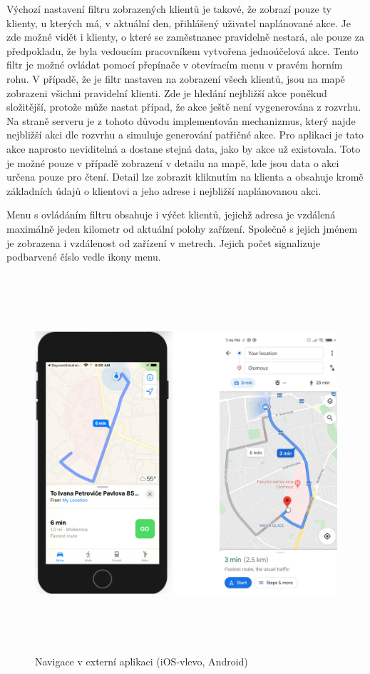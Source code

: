 \documentclass[
  glossaries,
]{kidiplom}
\begin{document}
Výchozí nastavení filtru zobrazených klientů je takové, že zobrazí pouze ty klienty, u kterých má, v aktuální den, přihlášený uživatel naplánované akce. Je zde možné vidět i klienty, o které se zaměstnanec pravidelně nestará, ale pouze za předpokladu, že byla vedoucím pracovníkem vytvořena jednoúčelová akce. Tento filtr je možné ovládat pomocí přepínače v otevíracím menu v pravém horním rohu. V případě, že je filtr nastaven na zobrazení všech klientů, jsou na mapě zobrazeni všichni pravidelní klienti. Zde je hledání nejbližší akce poněkud složitější, protože může nastat případ, že akce ještě není vygenerována z rozvrhu. Na straně serveru je z tohoto důvodu implementován mechanizmus, který najde nejbližší akci dle rozvrhu a simuluje generování patřičné akce. Pro aplikaci je tato akce naprosto neviditelná a dostane stejná data, jako by akce už existovala. Toto je možné pouze v případě zobrazení v detailu na mapě, kde jsou data o akci určena pouze pro čtení. Detail lze zobrazit kliknutím na klienta a obsahuje kromě základních údajů o klientovi a jeho adrese i nejbližší naplánovanou akci. 

Menu s ovládáním filtru obsahuje i výčet klientů, jejichž adresa je vzdálená maximálně jeden kilometr od aktuální polohy zařízení. Společně s jejich jménem je zobrazena i vzdálenost od zařízení v metrech. Jejich počet signalizuje podbarvené číslo vedle ikony menu.

\begin{figure}[H]
  	\centering
 	 \includegraphics[width=14cm,height=14cm,keepaspectratio]{external_navig}
 	 \caption{Navigace v externí aplikaci (iOS-vlevo, Android)}
 	 \label{fig:externalNavig}
\end{figure}
\end{document}
